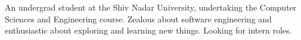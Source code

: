

\begin{cvparagraph}

An undergrad student at the Shiv Nadar University, undertaking the Computer Sciences and Engineering course. Zealous about software engineering and enthusiastic about exploring and learning new things. Looking for intern roles.
\end{cvparagraph}